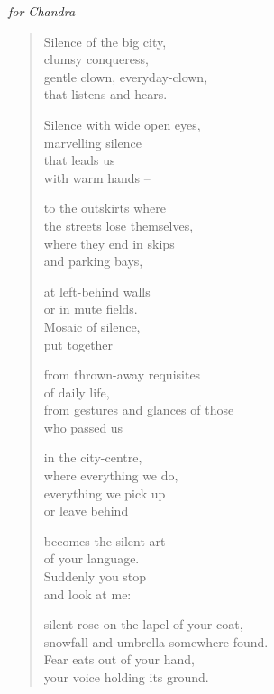 \hspace{2em}\emph{for Chandra}

\begin{verse}

Silence of the big city,\\
clumsy conqueress,\\
gentle clown, everyday-clown,\\
that listens and hears.

Silence with wide open eyes,\\
marvelling silence\\
that leads us\\
with warm hands --

to the outskirts where\\
the streets lose themselves,\\
where they end in skips\\
and parking bays,

at left-behind walls\\
or in mute fields.\\
Mosaic of silence,\\
put together

from thrown-away requisites\\
of daily life,\\
from gestures and glances of those\\
who passed us

in the city-centre,\\
where everything we do,\\
everything we pick up\\
or leave behind

becomes the silent art\\
of your language.\\
Suddenly you stop\\
and look at me:

silent rose on the lapel of your coat,\\
snowfall and umbrella somewhere found.\\
Fear eats out of your hand,\\
your voice holding its ground.

\end{verse}
